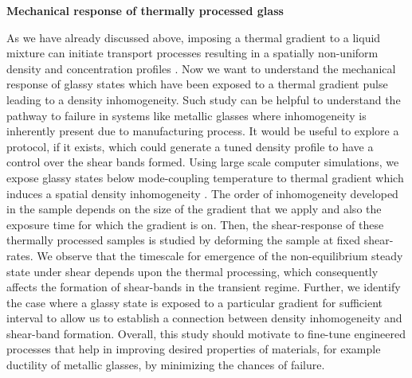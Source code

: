 \vskip 1.0cm
{\bf {\large Mechanical response of thermally processed glass}}
\vskip 0.3cm

As we have already discussed above, imposing a thermal gradient to a liquid mixture can initiate transport processes resulting in a spatially non-uniform density and concentration profiles \cite{vaibhav2020response}. Now we want to understand the mechanical response of glassy states which have been exposed to a thermal gradient pulse leading to a density inhomogeneity. Such study can be helpful to understand the pathway to failure in systems like metallic glasses where inhomogeneity is inherently present due to manufacturing process. It would be useful to explore a protocol, if it exists, which could generate a tuned density profile to have a control over the shear bands formed. Using large scale computer simulations, we expose glassy states below mode-coupling temperature to thermal gradient which induces a spatial density inhomogeneity \cite{vaibhavPrep}. The order of inhomogeneity developed in the sample depends on the size of the gradient that we apply and also the exposure time for which the gradient is on. Then, the shear-response of these thermally processed samples is studied by deforming the sample at fixed shear-rates. We observe that the timescale for emergence of the non-equilibrium steady state under shear depends upon the thermal processing, which consequently affects the formation of shear-bands in the transient regime. Further, we identify the case where a glassy state is exposed to a particular gradient for sufficient interval to allow us to establish a connection between density inhomogeneity and shear-band formation. Overall, this study should motivate to fine-tune engineered processes that help in improving desired properties of materials, for example ductility of metallic glasses, by minimizing the chances of failure.

